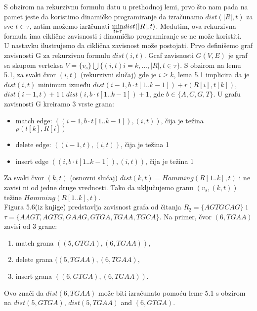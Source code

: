 \documentclass{article}
\begin{document}
S obzirom na rekurzivnu formulu datu u prethodnoj lemi, prvo što nam pada na pamet jeste da koristimo dinamičko programiranje da izračunamo $dist(\vert R\rvert, t)$ za sve $t \in \tau$, zatim možemo izrаčunati $\smash{\displaystyle \min_{t \in \tau}} dist(\vert R\rvert, t)$. Međutim, ova rekurzivna formula ima ciklične zavisnosti i dinamičko programiranje se ne može koristiti.\\

U nastavku ilustrujemo da ciklična zavisnost može postojati. Prvo definišemo graf zavisnosti G za rekurzivnu formulu $dist(i, t)$. Graf zavisnosti $G(V, E)$ je graf sa skupom verteksa $V = \{v_s\} \bigcup \{(i, t) $\vert$ i = k, ..., \vert R\rvert, t \in \tau\}$. S obzirom na lemu 5.1, za svaki čvor $(i, t)$ (rekurzivni slučaj) gde je $i \geq k$, lema 5.1 implicira da je $dist(i, t)$ minimum između $dist(i - 1, b \cdot t[1..k - 1]) + r (R[i], t[k])$, $dist(i - 1, t) + 1$ i $dist (i, b \cdot t[1..k - 1]) + 1$, gde $b \in \{A, C, G, T\}$. U grafu zavisnosti G kreiramo 3 vrste grana:\\
\begin{itemize}
    \item {match edge: $((i - 1, b \cdot t[1..k - 1]), (i, t))$, čija je težina $\rho (t[k], R[i])$}
    \item {delete edge: $((i - 1, t), (i, t))$, čija je težina 1}
    \item {insert edge $((i, b \cdot t[1..k - 1]), (i, t))$, čija je težina 1}
\end{itemize}

Za svaki čvor $(k, t)$ (osnovni slučaj) $dist(k, t) = Hamming(R[1..k], t)$ i ne zavisi ni od jedne druge vrednosti. Tako da uključujemo granu $(v_s,(k, t))$ težine $Hamming(R[1..k], t)$.\\

Figura 5.6(iz knjige) predstavlja zavisnost grafa od čitanja $R_2 = \{AGTGCAG\}$ i $\tau = \{AAGT, AGTG, GAAG, GTGA, TGAA, TGCA\}$. Na primer, čvor $(6, TGAA)$ zavisi od 3 grane:
\begin{enumerate}
    \item {match grana $((5, GTGA), (6, TGAA)),$}
    \item {delete grana $((5, TGAA), (6, TGAA),$}
    \item {insert grana $((6, GTGA), (6, TGAA)).$}
\end{enumerate}

Ovo znači da $dist(6, TGAA)$ može biti izračunato pomoću leme 5.1 s obzirom na $dist(5, GTGA)$, $dist(5, TGAA)$ and $(6, GTGA)$.\\
\end{document}
